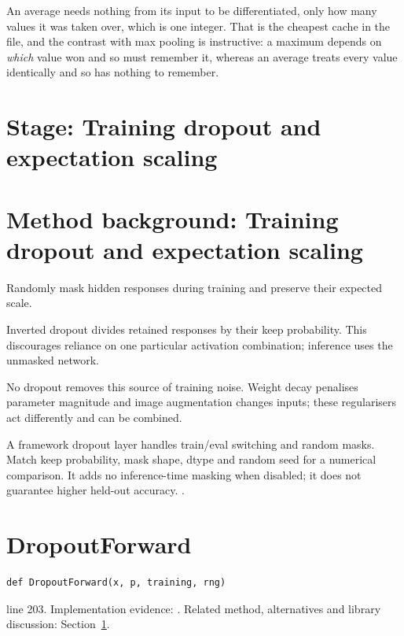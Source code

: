 An average needs nothing from its input to be differentiated, only how many values it was taken over, which is one integer. That is the cheapest cache in the file, and the contrast with max pooling is instructive: a maximum depends on \emph{which} value won and so must remember it, whereas an average treats every value identically and so has nothing to remember.



\section*{Stage: Training dropout and expectation scaling}
\section{Method background: Training dropout and expectation scaling}\label{method:dropout}
Randomly mask hidden responses during training and preserve their expected scale.


Inverted dropout divides retained responses by their keep probability. This discourages reliance on one particular activation combination; inference uses the unmasked network.


No dropout removes this source of training noise. Weight decay penalises parameter magnitude and image augmentation changes inputs; these regularisers act differently and can be combined.


A framework dropout layer handles train/eval switching and random masks. Match keep probability, mask shape, dtype and random seed for a numerical comparison. It adds no inference-time masking when disabled; it does not guarantee higher held-out accuracy. \cite{srivastava2014,code2026}.


\section{DropoutForward}\label{fn:train:DropoutForward}
\begin{lstlisting}[style=sig]
def DropoutForward(x, p, training, rng)
\end{lstlisting}
 line 203. Implementation evidence: \cite{code2026}. Related method, alternatives and library discussion: Section~\ref{method:dropout}.


